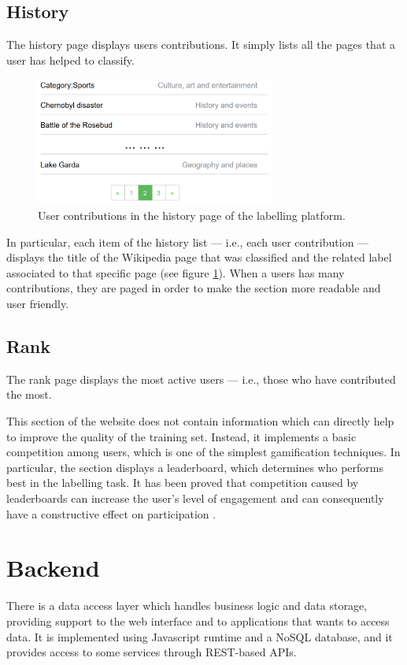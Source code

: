         \subsection{History}
            The history page displays users contributions. It simply lists all the pages that a user has helped to classify.
            
            \begin{figure}[h]
                \centering
                \includegraphics[width=0.7\textwidth]{images/history.png}
                \caption{User contributions in the history page of the labelling platform.}
                \label{history}
            \end{figure}
            
            In particular, each item of the history list --- i.e., each user contribution --- displays the title of the Wikipedia page that was classified and the related label associated to that specific page (see figure \ref{history}). When a users has many contributions, they are paged in order to make the section more readable and user friendly.
        \subsection{Rank}\label{rank}
            The rank page displays the most active users --- i.e., those who have contributed the most.
            
            This section of the website does not contain information which can directly help to improve the quality of the training set. Instead, it implements a basic competition among users, which is one of the simplest gamification techniques. In particular, the section displays a leaderboard, which determines who performs best in the labelling task. It has been proved that competition caused by leaderboards can increase the user's level of engagement and can consequently have a constructive effect on participation \cite{Burguillo}.
    \section{Backend}
        There is a data access layer which handles business logic and data storage, providing support to the web interface and to applications that wants to access data. It is implemented using Javascript runtime and a NoSQL database, and it provides access to some services through REST-based APIs.
